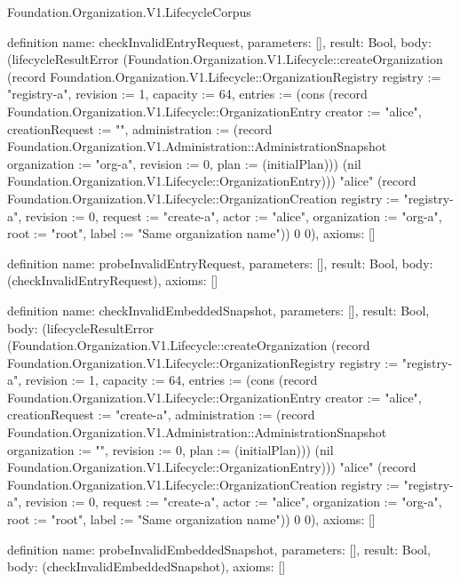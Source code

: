 \begin{lexlean}{Foundation.Organization.V1.LifecycleCorpus}
\begin{semanticmodule}
definition{
  name: checkInvalidEntryRequest,
  parameters: [],
  result: Bool,
  body: (lifecycleResultError (Foundation.Organization.V1.Lifecycle::createOrganization (record Foundation.Organization.V1.Lifecycle::OrganizationRegistry {registry := "registry-a", revision := 1, capacity := 64, entries := (cons (record Foundation.Organization.V1.Lifecycle::OrganizationEntry {creator := "alice", creationRequest := "", administration := (record Foundation.Organization.V1.Administration::AdministrationSnapshot {organization := "org-a", revision := 0, plan := (initialPlan)})}) (nil Foundation.Organization.V1.Lifecycle::OrganizationEntry))}) "alice" (record Foundation.Organization.V1.Lifecycle::OrganizationCreation {registry := "registry-a", revision := 0, request := "create-a", actor := "alice", organization := "org-a", root := "root", label := "Same organization name"})) 0 0),
  axioms: []
}

definition{
  name: probeInvalidEntryRequest,
  parameters: [],
  result: Bool,
  body: (checkInvalidEntryRequest),
  axioms: []
}

definition{
  name: checkInvalidEmbeddedSnapshot,
  parameters: [],
  result: Bool,
  body: (lifecycleResultError (Foundation.Organization.V1.Lifecycle::createOrganization (record Foundation.Organization.V1.Lifecycle::OrganizationRegistry {registry := "registry-a", revision := 1, capacity := 64, entries := (cons (record Foundation.Organization.V1.Lifecycle::OrganizationEntry {creator := "alice", creationRequest := "create-a", administration := (record Foundation.Organization.V1.Administration::AdministrationSnapshot {organization := "", revision := 0, plan := (initialPlan)})}) (nil Foundation.Organization.V1.Lifecycle::OrganizationEntry))}) "alice" (record Foundation.Organization.V1.Lifecycle::OrganizationCreation {registry := "registry-a", revision := 0, request := "create-a", actor := "alice", organization := "org-a", root := "root", label := "Same organization name"})) 0 0),
  axioms: []
}

definition{
  name: probeInvalidEmbeddedSnapshot,
  parameters: [],
  result: Bool,
  body: (checkInvalidEmbeddedSnapshot),
  axioms: []
}


\end{semanticmodule}
\end{lexlean}
